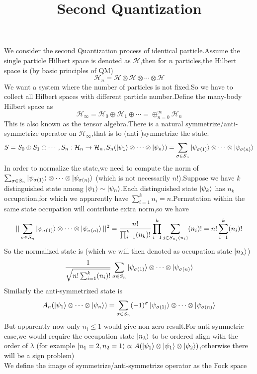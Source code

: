 \documentclass[a4paper,12pt]{article}
\title{Second Quantization}
\theoremstyle{mystyle}
\theoremstyle{mystyle}
\numberwithin{equation}{section}
\begin{document}
	\maketitle
	We consider the second Quantization process of identical particle.Assume the single particle Hilbert space is denoted as $\mathcal{H}$,then for $n$ particles,the Hilbert space is (by basic principles of QM)
	$$\mathcal{H}_n=\mathcal{H}\otimes \mathcal{H}\otimes  \cdots \otimes \mathcal{H}$$
	We want a system where the number of particles is not fixed.So we have to collect all Hilbert spaces with different particle number.Define the many-body Hilbert space as
	$$\mathcal{H}_\infty=\mathcal{H}_0\oplus \mathcal{H}_1\oplus\cdots =\oplus_{n=0}^\infty \mathcal{H}_n$$
	This is also known as the tensor algebra.There is a natural symmetrize/anti-symmetrize operator on $\mathcal{H}_\infty$,that is to (anti-)symmetrize the state.
	$$S=S_0\oplus S_1\oplus\cdots,S_n:\mathcal{H}_n\to \mathcal{H}_n,S_n(\ket{\psi_1}\otimes\cdots \otimes \ket{\psi_n})=\sum_{\sigma\in S_n} \ket{\psi_{\sigma(1)}}\otimes\cdots \otimes\ket{\psi_{\sigma(n)}}$$
	In order to normalize the state,we need to compute the norm of $\sum_{\sigma\in S_n} \ket{\psi_{\sigma(1)}}\otimes\cdots \otimes\ket{\psi_{\sigma(n)}}$ (which is not necessarily $n!$).Suppose we have $k$ distinguished state among $\ket{\psi_1}\sim \ket{\psi_n}$.Each distinguished state $\ket{\psi_k}$ has $n_k$ occupation,for which we apparently have $\sum_{i=1}^k n_i=n$.Permutation within the same state occupation will contribute extra norm,so we have
	$$||\sum_{\sigma\in S_n} \ket{\psi_{\sigma(1)}}\otimes\cdots \otimes\ket{\psi_{\sigma(n)}}||^2=\frac{n!}{\prod_{i=1}^k (n_k)!}\prod_{i=1}^k \sum_{j\in S_{n_i}(n_i)} (n_i)!=n!\sum_{i=1}^k (n_i)!$$
	So the normalized state is (which we will then denoted as occupation state $\ket{n_\lambda}$)
	$$\frac{1}{\sqrt{n!\sum_{i=1}^k (n_i)!}}\sum_{\sigma\in S_n} \ket{\psi_{\sigma(1)}}\otimes\cdots \otimes\ket{\psi_{\sigma(n)}}$$
	Similarly the anti-symmetrized state is
	$$A_n(\ket{\psi_1}\otimes\cdots \otimes \ket{\psi_n})=\sum_{\sigma\in S_n} (-1)^\sigma\ket{\psi_{\sigma(1)}}\otimes\cdots \otimes\ket{\psi_{\sigma(n)}}$$
	But apparently now only $n_i\leq 1$ would give non-zero result.For anti-symmetric case,we would require the occupation state $\ket{n_\lambda}$ to be ordered align with the order of $\lambda$ (for example $\ket{n_1=2,n_2=1}\propto A(\ket{\psi_1}\otimes\ket{\psi_1}\otimes \ket{\psi_2})$,otherwise there will be a sign problem)
	\\
	We define the image of symmetrize/anti-symmetrize operator as the Fock space
\end{document}
